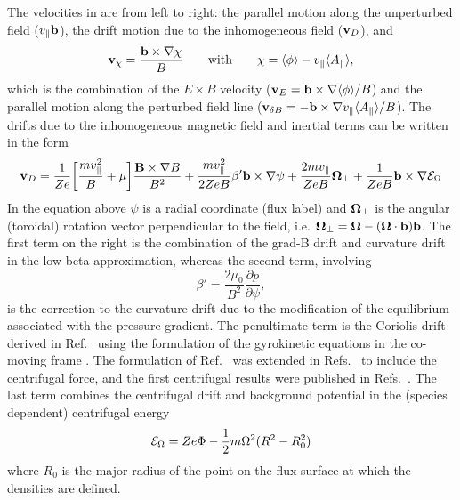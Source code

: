 The velocities in  are from left to right: the parallel motion along the 
unperturbed field ($v_\parallel {\bf b}$), the drift motion due to the inhomogeneous field 
(${\bf v}_D$), and 
\begin{equation} 
\label{eq:v-chi}
{\bf v}_\chi = {{\bf b} \times \nabla \chi \over B} \qquad 
\textrm{with} \qquad \chi = \langle \phi \rangle - v_\parallel \langle A_\parallel \rangle ,
\end{equation}
which is the combination of the $E \times B$ velocity 
(${\bf v}_E = {\bf b} \times \nabla \langle \phi \rangle / B$) and the parallel motion along 
the perturbed field line (${\bf v}_{\delta B} = - {{\bf b} \times \nabla v_\parallel 
\langle A_\parallel \rangle /B}$).
The drifts due to the inhomogeneous magnetic field and inertial terms can be written in the form
\begin{equation}
\label{eq:driftsinhomogeneousinterial}
{\bf v}_D = 
{1\over Ze} \biggl [ {m v_\parallel^2\over B} + \mu \biggr ] {{\bf B} \times \nabla B \over B^2}  
+ {m v_\parallel^2 \over 2 Z e B} \beta^\prime {\bf b} \times \nabla \psi
+ { 2 m v_\parallel \over Z e B } {\bf \Omega}_\perp + {1 \over ZeB} {\bf b} \times \nabla \mathcal{E}_\Omega
\end{equation}
In the equation above $\psi$ is a radial coordinate (flux label) and ${\bf \Omega}_\perp$ is the angular
(toroidal) rotation vector perpendicular to the field, i.e. ${\bf \Omega}_\perp = {\bf \Omega} 
- ({\bf \Omega } \cdot {\bf b}) {\bf b}$.
The first term on the right is the combination of the grad-B drift and curvature drift 
in the low beta approximation, whereas the second term, involving
\begin{equation}
\label{eq:defbetapr}
\beta' = \frac{2\mu_0}{B^2}\frac{\partial p}{\partial \psi},
\end{equation}
is the correction to the 
curvature drift due to the modification of the equilibrium associated with the pressure
gradient. The penultimate term is the Coriolis drift derived in Ref.~\cite{PEE07} 
using the formulation of the gyrokinetic equations in the co-moving frame \cite{BRI95}.
The formulation of Ref.~\cite{PEE07} was extended in Refs.~\cite{PEE09,Casson-Thesis} to include 
the centrifugal force, and the first centrifugal results were published in  Refs.~\cite{CAS10,Casson-Thesis}.  
The last term combines the centrifugal drift and background potential 
in the (species dependent) centrifugal energy
\begin{equation}
\mathcal{E}_\Omega=Ze\Phi - {1 \over 2} m \Omega^2 (R^2-R_0^2)
\end{equation}
where $R_0$ is the major radius of the point on the flux surface at which the densities are defined.


